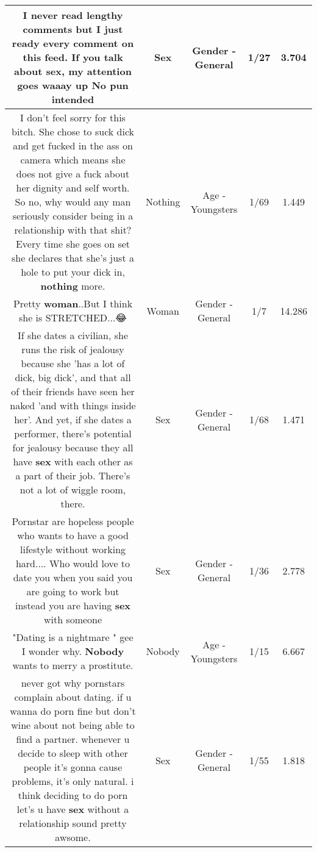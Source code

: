 \documentclass[11pt]{article}
\newlength\mylength
\begin{document}
\begin{center}
\begin{longtable}{|C{.65\mylength}|C{.30\mylength}|C{.12\mylength}|C{.12\mylength}|C{.12\mylength}|}
  \small I never read lengthy comments but I just ready every comment on this feed. If you talk about \textbf{sex}, my attention goes waaay up No pun intended\normalsize   & Sex & Gender - General & 1/27 & 3.704 \\  \hline
  \small I don't feel sorry for this bitch. She chose to suck dick and get fucked in the ass on camera which means she does not give a fuck about her dignity and self worth. So no, why would any man seriously consider being in a relationship with that shit? Every time she goes on set she declares that she's just a hole to put your dick in, \textbf{nothing} more.\normalsize   & Nothing & Age - Youngsters & 1/69 & 1.449 \\  \hline
  \small Pretty \textbf{woman}..But I think she is STRETCHED...😂\normalsize   & Woman & Gender - General & 1/7 & 14.286 \\  \hline
  \small If she dates a civilian, she runs the risk of jealousy because she 'has a lot of dick, big dick', and that all of their friends have seen her naked 'and with things inside her'.  And yet, if she dates a performer, there's potential for jealousy because they all have \textbf{sex} with each other as a part of their job.  There's not a lot of wiggle room, there.\normalsize   & Sex & Gender - General & 1/68 & 1.471 \\  \hline
  \small Pornstar are hopeless people who wants to have a good lifestyle without working hard.... Who would love to date you when you said you are going to work but instead you are having \textbf{sex} with someone\normalsize   & Sex & Gender - General & 1/36 & 2.778 \\  \hline
  \small "Dating is a nightmare " gee I wonder why. \textbf{Nobody} wants to merry a prostitute.\normalsize   & Nobody & Age - Youngsters & 1/15 & 6.667 \\  \hline
  \small never got why pornstars complain about dating. if u wanna do porn fine but don't wine about not being able to find a partner. whenever u decide to sleep with other people it's gonna cause problems, it's only natural. i think deciding to do porn let's u have \textbf{sex} without a relationship sound pretty awsome.\normalsize   & Sex & Gender - General & 1/55 & 1.818 \\  \hline

\end{longtable}
\end{center}
\end{document}
